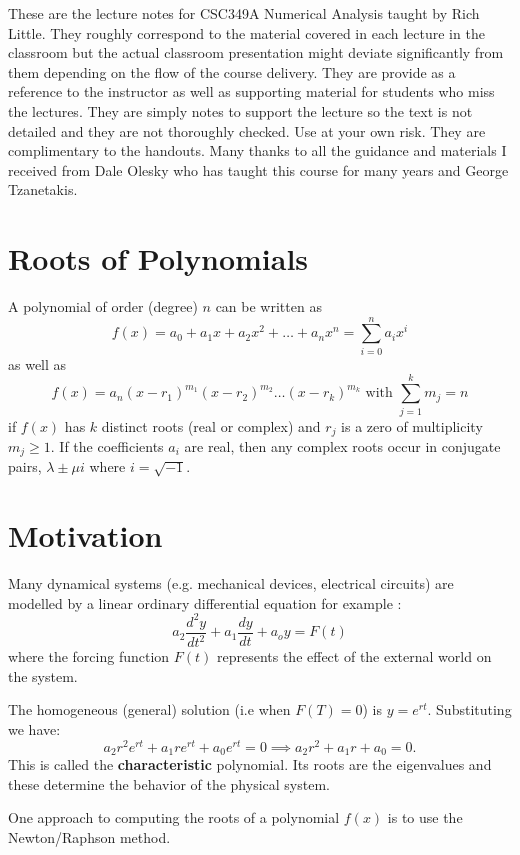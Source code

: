 \documentclass [titlepage,12pt,letter] {article}
\begin{document}
 


These are the lecture notes for CSC349A Numerical Analysis taught by
Rich Little. They roughly correspond to
the material covered in each lecture in the classroom but the actual
classroom presentation might deviate significantly from them depending
on the flow of the course delivery. They are provide as a reference to
the instructor as well as supporting material for students who miss
the lectures. They are simply notes to support the lecture so the text
is not detailed and they are not thoroughly checked. Use at your own
risk. They are complimentary to the handouts. Many thanks to all the
guidance and materials I received from Dale Olesky who has taught this
course for many years and George Tzanetakis. 



\section{Roots of Polynomials} 

A polynomial of order (degree) $n$ can be written as 
\[
f(x) = a_0 + a_1 x + a_2 x^2 + \dots + a_n x^n = \sum_{i=0}^{n} a_i x^i
\] 
\noindent 
as well as
\[
f(x) = a_n (x - r_1)^{m_1}(x-r_2)^{m_2} \dots (x-r_k) ^{m_k}  \mbox{ with } \sum_{j=1}^{k} m_j = n 
\] 
\noindent 
if $f(x)$ has $k$ distinct roots (real or complex) and $r_j$ is a zero of multiplicity $m_j \geq 1$. If the coefficients $a_i$ are real, then any complex roots occur in conjugate pairs, $\lambda \pm \mu i$ where $i = \sqrt{-1}$. 


\section{Motivation} 

Many dynamical systems (e.g. mechanical devices, electrical circuits) are modelled by a linear ordinary differential equation for example : 
\[
a_2 \frac{d^2y}{dt^2} + a_1 \frac{dy}{dt} + a_o y = F(t) 
\]
\noindent 
where the forcing function $F(t)$ represents the effect of the external world on the system. 

The homogeneous (general) solution (i.e when $F(T) = 0$)  is $y= e^{rt}$. 
Substituting we have: 
\[
a_2 r^2 e^{rt} + a_1 r e^{rt} + a_0 e^{rt} = 0 \implies a_2 r^2 + a_1 r + a_0 = 0. 
\]
\noindent 
This is called the {\bf characteristic} polynomial. Its roots are the eigenvalues and these determine the behavior of the physical system. 

One approach to computing the roots of a polynomial $f(x)$ is to use the Newton/Raphson method. 
\end{document}
